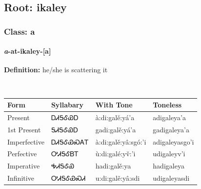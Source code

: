 \needspace{4in}
\subsection*{Root: ikaley}
\nopagebreak
{}
\needspace{3in}
\subsubsection*{Class: a}
\nopagebreak
\needspace{2in}
\paragraph*{\textit{a}{-}at{-}\textbf{ikaley}{-}[a]}
\nopagebreak
\textbf{Definition: } he/she is scattering it
\\[0.5em]
\begin{tabularx}{\textwidth}{l X X X}%
\toprule%
\textbf{Form}&\textbf{Syllabary}&\textbf{With Tone}&\textbf{Toneless}\\%
\midrule%
Present&ᎠᏗᎦᎴᏯᎠ&à:di:galě:yá’a&adigaleya’a\\%
1st Present&ᎦᏗᎦᎴᏯᎠ&gadi:galě:yá’a&gadigaleya’a\\%
Imperfective&ᎠᏗᎦᎴᏯᏍᎪᎢ&à:di:galě:yâ:sgó:’i&adigaleyasgo’i\\%
Perfective&ᎤᏗᎦᎴᏴᎢ&ù:di:galé:yv̌:’i&udigaleyv’i\\%
Imperative&ᎭᏗᎦᎴᏯ&hadi:galě:ya&hadigaleya\\%
Infinitive&ᎤᏗᎦᎴᏯᏍᏗ&u:di:galě:yâ:sdi&udigaleyasdi\\%
\bottomrule%
\end{tabularx}
\\[1em]